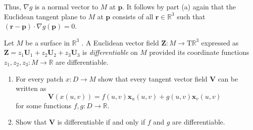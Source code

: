 \documentclass[12 pt, letterpaper]{hmcpset}
\begin{document}
\begin{solution}
\begin{enumerate}
			Thus, $\nabla g$ is a normal vector to $M$ at $\mathbf{p}$. It follows by part (a) again that the Euclidean tangent plane to $M$ at $\mathbf{p}$ consists of all $\mathbf{r} \in \mathbb{R}^{3}$ such that $(\mathbf{r} - \mathbf{p}) \cdot \nabla g(\mathbf{p}) = 0$.
			
		\end{enumerate}
\end{solution}

\pagebreak

\begin{problem}[Problem 3.]
	Let $M$  be a surface in $\mathbb{R}^{3}$ . A Euclidean vector field  $\mathbf{Z} : M \to \mathrm{T}\mathbb{R}^{3}$ expressed as $\mathbf{Z} = z_{1} \mathbf{U}_{1} + z_{2} \mathbf{U}_2 + z_{3} \mathbf{U}_{3}$ is \textit{differentiable} on $M$  provided its coordinate functions $z_{1}, z_{2}, z_{3} : M \to \mathbb{R}$  are differentiable.
	\begin{enumerate}
		\item For every patch $x : D \to M$ show that every tangent vector field $\mathbf{V}$ can be written as
			\[
				\mathbf{V}(x(u, v)) = f(u, v) \mathbf{x}_{u}(u, v) + g(u, v) \mathbf{x}_{v}(u, v)
			\]
			for some functions $f, g : D \to \mathbb{R}$.
		\item Show that $\mathbf{V}$ is differentiable if and only if $f$ and $g$ are differentiable.	
	\end{enumerate}
\end{problem}
\end{document}
